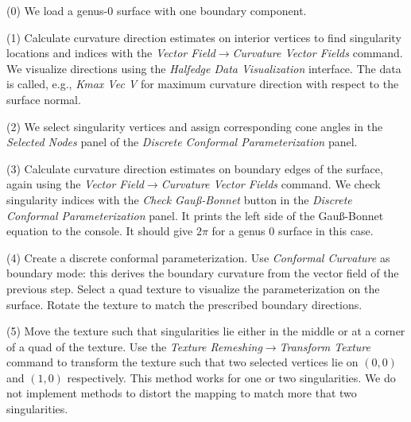 \documentclass[Thesis.tex]{subfiles}
\begin{document}
\begin{compactenum}[(1)]
\item[(0)] We load a genus-$0$ surface with one boundary component.
\item[(1)] Calculate curvature direction estimates on interior vertices to find singularity locations and indices with the \emph{Vector Field$\to$Curvature Vector Fields} command. We visualize directions using the \emph{Halfedge Data Visualization} interface. The data is called, e.g., \emph{Kmax Vec V} for maximum curvature direction with respect to the surface normal.
\item[(2)] We select singularity vertices and assign corresponding cone angles in the \emph{Selected Nodes} panel of the \emph{Discrete Conformal Parameterization} panel.
\item[(3)] Calculate curvature direction estimates on boundary edges of the surface, again using the \emph{Vector Field$\to$Curvature Vector Fields} command. We check singularity indices with the \emph{Check Gau{\ss}-Bonnet} button in the \emph{Discrete Conformal Parameterization} panel. It prints the left side of the Gau{\ss}-Bonnet equation to the console. It should give $2\pi$ for a genus $0$ surface in this case.

\begin{center}
\begin{minipage}{\linewidth}
            \centering
\end{minipage}
\end{center}     
            
\item[(4)] Create a discrete conformal parameterization. Use \emph{Conformal Curvature} as boundary mode: this derives the boundary curvature from the vector field of the previous step. Select a quad texture to visualize the parameterization on the surface. Rotate the texture to match the prescribed boundary directions.
\item[(5)] Move the texture such that singularities lie either in the middle or at a corner of a quad of the texture. Use the \emph{Texture Remeshing$\to$Transform Texture} command to transform the texture such that two selected vertices lie on $(0,0)$ and $(1,0)$ respectively. This method works for one or two singularities. We do not implement methods to distort the mapping to match more that two singularities.


\end{compactenum}
\end{document}
